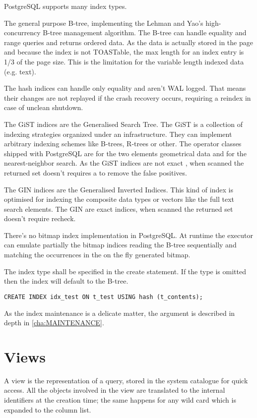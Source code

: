 PostgreSQL supports many index types. 

The general purpose B-tree, implementing the Lehman and 
Yao's high-concurrency B-tree management algorithm. The B-tree can handle 
equality and range queries and returns ordered data. As the data is actually 
stored in the page and because the index is not TOASTable, the max length for an 
index entry is 1/3 of the page size. This is the limitation for the variable 
length indexed data (e.g. text). \newline

The hash indices can handle only equality and aren't WAL 
logged. That means their changes are not replayed if the crash recovery occurs, 
requiring a reindex in case of unclean shutdown.\newline

The GiST indices are the Generalised Search Tree. The GiST 
is a collection of indexing strategies organized under an 
infrastructure. They can implement arbitrary indexing schemes like B-trees, 
R-trees  or other. The operator classes shipped with PostgreSQL are for the two 
elements geometrical data and for the nearest-neighbor search. As the GiST 
indices are not exact , when scanned the returned set doesn't requires a to 
remove the false positives.\newline

The GIN indices  are the Generalised Inverted Indices. This 
kind of index is optimised for indexing the composite data types or vectors 
like the full text search elements. The GIN are exact indices, when scanned the 
returned set doesn't require recheck.

There's no bitmap index implementation in PostgreSQL. 
At runtime the executor can emulate partially the bitmap indices reading the 
B-tree sequentially and matching the occurrences in the on the fly generated 
bitmap. 

The index type shall be specified in the create statement. If the type is 
omitted then the index will default to the B-tree.

\begin{lstlisting}[style=pgsql]
 CREATE INDEX idx_test ON t_test USING hash (t_contents);
\end{lstlisting}


As the index maintenance is a delicate matter, the argument is described in 
depth in \ref{cha:MAINTENANCE}.


\section{Views}
\label{sec:VIEWS}
A view is the representation of a query, stored in the system catalogue 
for quick access. All the objects involved in the view are translated to the 
internal identifiers at the creation time; the same happens for any wild card 
which is expanded to the column list.

